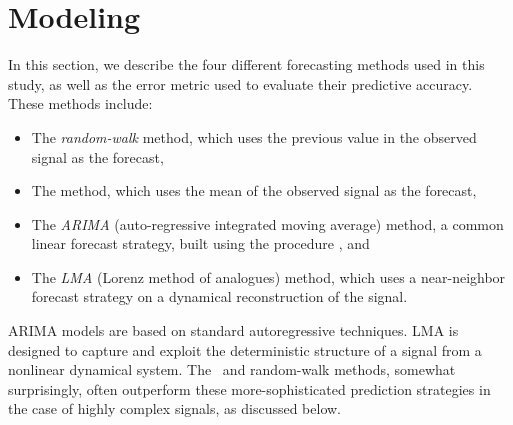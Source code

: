 \section{Modeling }\label{sec:model}
%
%
%
%

In this section, we describe the four different forecasting methods
used in this study, as well as the error metric used to evaluate their
predictive accuracy.  These methods include:
\begin{itemize}
\item The \emph{random-walk} method, which uses the previous value in
  the observed signal as the forecast,

\item The \emph{\naive} method, which uses the mean of the
  observed signal as the forecast,

\item The \emph{ARIMA} (auto-regressive integrated moving average)
  method, a common linear forecast strategy, built using the
  \emph{\arima} procedure \cite{autoARIMA}, and

\item The \emph{LMA} (Lorenz method of analogues) method, which uses a
  near-neighbor forecast strategy on a dynamical reconstruction of the
  signal.
\end{itemize}
ARIMA models are based on standard autoregressive techniques.  LMA is
designed to capture and exploit the deterministic structure of a
signal from a nonlinear dynamical system.  The \naive ~and random-walk
methods, somewhat surprisingly, often outperform these
more-sophisticated prediction strategies in the case of highly complex
signals, as discussed below.

